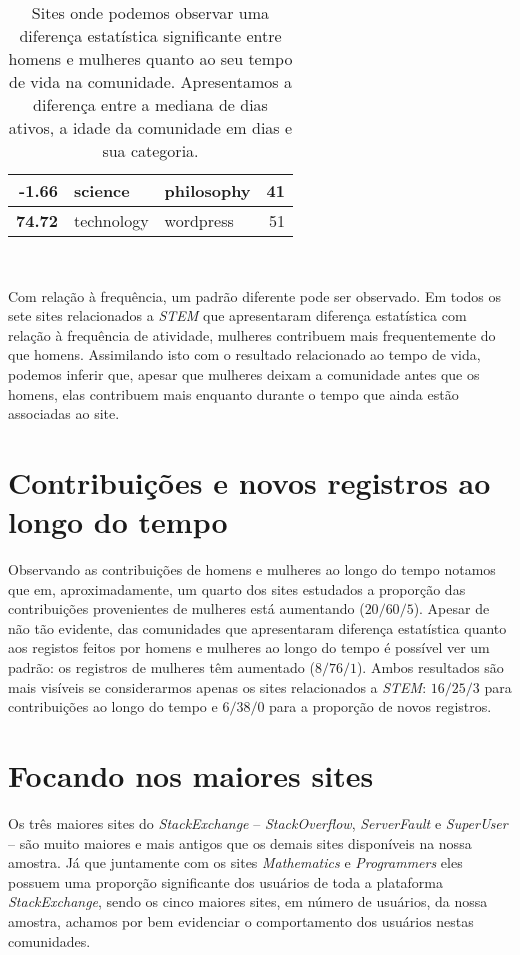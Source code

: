 \begin{table}[!b]
\begin{tabular}{@{}rllr@{}}
-1.66                             & science            & philosophy         & 41                 \\ \midrule
\textbf{74.72}                             & technology         & wordpress          & 51                 \\ \bottomrule
\end{tabular}
\caption[Diferença de tempo de vida entre homens e mulheres]{Sites onde podemos observar uma diferença estatística significante entre homens e mulheres quanto ao seu tempo de vida na comunidade. Apresentamos a diferença entre a mediana de dias ativos, a idade da comunidade em dias e sua categoria.}~\label{table:lifetime}
\end{table}

Com relação à frequência, um padrão diferente pode ser observado. Em todos os sete sites relacionados a \emph{STEM} que apresentaram diferença estatística com relação à frequência de atividade, mulheres contribuem mais frequentemente do que homens. Assimilando isto com o resultado relacionado ao tempo de vida, podemos inferir que, apesar que mulheres deixam a comunidade antes que os homens, elas contribuem mais enquanto durante o tempo que ainda estão associadas ao site.


\section{Contribuições e novos registros ao longo do tempo}
Observando as contribuições de homens e mulheres ao longo do tempo notamos que em, aproximadamente, um quarto dos sites estudados a proporção das contribuições provenientes de mulheres está aumentando ($20/60/5$). Apesar de não tão evidente, das comunidades que apresentaram diferença estatística quanto aos registos feitos por homens e mulheres ao longo do tempo é possível ver um padrão: os registros de mulheres têm aumentado ($8/76/1$). Ambos resultados são mais visíveis se considerarmos apenas os sites relacionados a \emph{STEM}: $16/25/3$ para contribuições ao longo do tempo e $6/38/0$ para a proporção de novos registros.

\section{Focando nos maiores sites} 

Os três maiores sites do \emph{StackExchange} -- \emph{StackOverflow}, \emph{ServerFault} e \emph{SuperUser} -- são muito maiores e mais antigos que os demais sites disponíveis na nossa amostra. Já que juntamente com os sites \emph{Mathematics} e \emph{Programmers} eles possuem uma proporção significante dos usuários de toda a plataforma \emph{StackExchange}, sendo os cinco maiores sites, em número de usuários, da nossa amostra, achamos por bem evidenciar o comportamento dos usuários nestas comunidades. 

